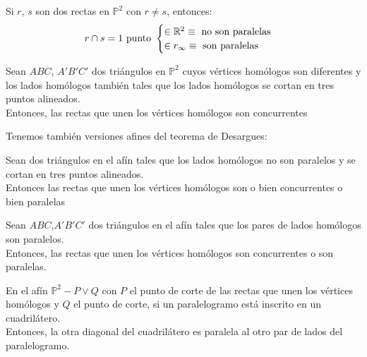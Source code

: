 \begin{nprop}
	Si $r$, $s$ son dos rectas en $\mathbb P^2$ con $r\ne s$, entonces:
	\[
	r \cap s = 1 \text { punto } \begin{cases}
	\in \mathbb{R}^2 \equiv \text{ no son paralelas}\\

	\in r_\infty \equiv \text{ son paralelas}

\end{cases}
	\]
\end{nprop}

\begin{nth}
	Sean $ABC$, $A'B'C'$ dos triángulos en $\mathbb P^2$ cuyos vértices homólogos son diferentes y los lados homólogos también tales que los lados homólogos se cortan en tres puntos alineados.\\
	Entonces, las rectas que unen los vértices homólogos son concurrentes
\end{nth}

Tenemos también versiones afines del teorema de Desargues:

\begin{nth}
	Sean dos triángulos en el afín tales que los lados homólogos no son paralelos y se cortan en tres puntos alineados.\\
	  Entonces las rectas que unen los vértices homólogos son o bien concurrentes o bien paralelas
\end{nth}

\begin{nth}
	Sean $ABC$,$A'B'C'$ dos triángulos en el afín tales que los pares de lados homólogos son paralelos.\\
	Entonces, las rectas que unen los vértices homólogos son concurrentes o son paralelas.
\end{nth}


\begin{nth}
	En el afín $\mathbb P^2 - P\vee Q$ con $P$ el punto de corte de las rectas que unen los vértices homólogos y $Q$  el punto de corte, si un paralelogramo está inscrito en un cuadrilátero.\\
	Entonces, la otra diagonal del cuadrilátero es paralela al otro par de lados del paralelogramo.
\end{nth}


